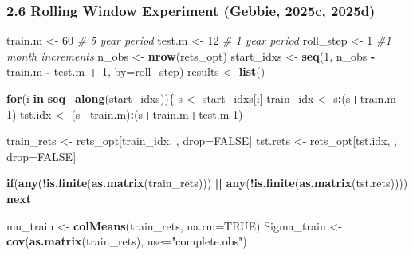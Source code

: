 \documentclass[
  12pt,
]{article}
\newenvironment{Shaded}{\begin{snugshade}}{\end{snugshade}}
\newcommand{\AttributeTok}[1]{\textcolor[rgb]{0.13,0.29,0.53}{#1}}
\newcommand{\CommentTok}[1]{\textcolor[rgb]{0.56,0.35,0.01}{\textit{#1}}}
\newcommand{\ConstantTok}[1]{\textcolor[rgb]{0.56,0.35,0.01}{#1}}
\newcommand{\ControlFlowTok}[1]{\textcolor[rgb]{0.13,0.29,0.53}{\textbf{#1}}}
\newcommand{\DecValTok}[1]{\textcolor[rgb]{0.00,0.00,0.81}{#1}}
\newcommand{\FunctionTok}[1]{\textcolor[rgb]{0.13,0.29,0.53}{\textbf{#1}}}
\newcommand{\NormalTok}[1]{#1}
\newcommand{\OtherTok}[1]{\textcolor[rgb]{0.56,0.35,0.01}{#1}}
\newcommand{\SpecialCharTok}[1]{\textcolor[rgb]{0.81,0.36,0.00}{\textbf{#1}}}
\newcommand{\StringTok}[1]{\textcolor[rgb]{0.31,0.60,0.02}{#1}}
\begin{document}
\subsubsection{2.6 Rolling Window Experiment (Gebbie, 2025c,
2025d)}\label{rolling-window-experiment-tim_btmlx-tim_prep}

\begin{Shaded}
\begin{Highlighting}[]
\NormalTok{train.m }\OtherTok{\textless{}{-}} \DecValTok{60} \CommentTok{\# 5 year period}
\NormalTok{test.m  }\OtherTok{\textless{}{-}} \DecValTok{12} \CommentTok{\# 1 year period}
\NormalTok{roll\_step }\OtherTok{\textless{}{-}} \DecValTok{1} \CommentTok{\#1 month increments}
\NormalTok{n\_obs }\OtherTok{\textless{}{-}} \FunctionTok{nrow}\NormalTok{(rets\_opt)}
\NormalTok{start\_idxs }\OtherTok{\textless{}{-}} \FunctionTok{seq}\NormalTok{(}\DecValTok{1}\NormalTok{, n\_obs }\SpecialCharTok{{-}}\NormalTok{ train.m }\SpecialCharTok{{-}}\NormalTok{ test.m }\SpecialCharTok{+} \DecValTok{1}\NormalTok{, }\AttributeTok{by=}\NormalTok{roll\_step)}
\NormalTok{results }\OtherTok{\textless{}{-}} \FunctionTok{list}\NormalTok{()}

\ControlFlowTok{for}\NormalTok{(i }\ControlFlowTok{in} \FunctionTok{seq\_along}\NormalTok{(start\_idxs))\{}
\NormalTok{  s }\OtherTok{\textless{}{-}}\NormalTok{ start\_idxs[i]}
\NormalTok{  train\_idx }\OtherTok{\textless{}{-}}\NormalTok{ s}\SpecialCharTok{:}\NormalTok{(s}\SpecialCharTok{+}\NormalTok{train.m}\DecValTok{{-}1}\NormalTok{)}
\NormalTok{  tst.idx  }\OtherTok{\textless{}{-}}\NormalTok{ (s}\SpecialCharTok{+}\NormalTok{train.m)}\SpecialCharTok{:}\NormalTok{(s}\SpecialCharTok{+}\NormalTok{train.m}\SpecialCharTok{+}\NormalTok{test.m}\DecValTok{{-}1}\NormalTok{)}
  
\NormalTok{  train\_rets }\OtherTok{\textless{}{-}}\NormalTok{ rets\_opt[train\_idx, , drop}\OtherTok{=}\ConstantTok{FALSE}\NormalTok{]}
\NormalTok{  tst.rets  }\OtherTok{\textless{}{-}}\NormalTok{ rets\_opt[tst.idx, , drop}\OtherTok{=}\ConstantTok{FALSE}\NormalTok{]}
  
  \ControlFlowTok{if}\NormalTok{(}\FunctionTok{any}\NormalTok{(}\SpecialCharTok{!}\FunctionTok{is.finite}\NormalTok{(}\FunctionTok{as.matrix}\NormalTok{(train\_rets))) }\SpecialCharTok{||} \FunctionTok{any}\NormalTok{(}\SpecialCharTok{!}\FunctionTok{is.finite}\NormalTok{(}\FunctionTok{as.matrix}\NormalTok{(tst.rets)))) }\ControlFlowTok{next}
  
\NormalTok{  mu\_train    }\OtherTok{\textless{}{-}} \FunctionTok{colMeans}\NormalTok{(train\_rets, }\AttributeTok{na.rm=}\ConstantTok{TRUE}\NormalTok{)}
\NormalTok{ Sigma\_train }\OtherTok{\textless{}{-}} \FunctionTok{cov}\NormalTok{(}\FunctionTok{as.matrix}\NormalTok{(train\_rets), }\AttributeTok{use=}\StringTok{"complete.obs"}\NormalTok{)}


\end{Highlighting}
\end{Shaded}
\end{document}
